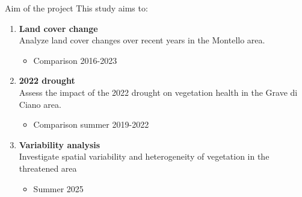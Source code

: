 \documentclass{beamer}
\begin{document}
\begin{frame}{Aim of the project}
This study aims to:
\begin{enumerate}
        \item \textbf{Land cover change} \\
        Analyze land cover changes over recent years in the Montello area.\\
        \begin{itemize}
            \item Comparison 2016-2023
            \end{itemize}
        \bigskip
        \item \textbf{2022 drought} \\
        Assess the impact of the 2022 drought on vegetation health in the Grave di Ciano area.\\
            \begin{itemize}
                \item Comparison summer 2019-2022
                \end{itemize}
        \bigskip
        \item \textbf{Variability analysis} \\
        Investigate spatial variability and heterogeneity of vegetation in the threatened area \\
        \begin{itemize}
                \item Summer 2025
                \end{itemize}
        \bigskip
    \end{enumerate}
\end{frame}
\end{document}
